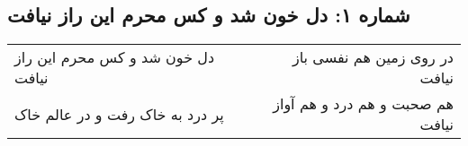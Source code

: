 \begin{center}
\section*{شماره ۱: دل خون شد و کس محرم این راز نیافت}
\label{sec:001}
\begin{longtable}{l p{0.5cm} r}
دل خون شد و کس محرم این راز نیافت
&&
در روی زمین هم نفسی باز نیافت
\\
پر درد به خاک رفت و در عالم خاک
&&
هم صحبت و هم درد و هم آواز نیافت
\\
\end{longtable}
\end{center}
